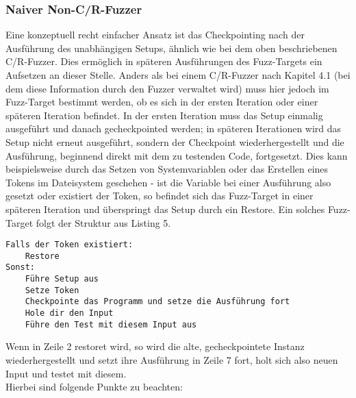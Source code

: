 \documentclass[a4paper]{article}
\begin{document}
\subsubsection{Naiver Non-C/R-Fuzzer}
Eine konzeptuell recht einfacher Ansatz ist das Checkpointing nach der Ausfüh\-rung des unabhängigen Setups, ähnlich wie bei dem oben beschriebenen C/R-Fuzzer.
Dies ermöglich in späteren Ausführungen des Fuzz-Targets ein Aufsetzen an dieser Stelle.
Anders als bei einem C/R-Fuzzer nach Kapitel 4.1 (bei dem diese Information durch den Fuzzer verwaltet wird) muss hier jedoch im Fuzz-Target bestimmt werden, ob es sich in der ersten Iteration oder einer späteren Iteration befindet. 
In der ersten Iteration muss das Setup einmalig ausgeführt und danach gecheckpointed werden; in späteren Iterationen wird das Setup nicht erneut ausgeführt, sondern der Checkpoint wiederhergestellt und die Ausführung, beginnend direkt mit dem zu testenden Code, fortgesetzt.
Dies kann beispielsweise durch das Setzen von Systemvariablen oder das Erstellen eines Tokens im Dateisystem geschehen - ist die Variable bei einer Ausführung also gesetzt oder existiert der Token, so befindet sich das Fuzz-Target in einer späteren Iteration und überspringt das Setup durch ein Restore.
Ein solches Fuzz-Target folgt der Struktur aus Listing 5.
\begin{lstlisting}[caption=Struktur C/R-Fuzz-Target für Non-C/R-Fuzzer]
Falls der Token existiert:
    Restore
Sonst:
    Führe Setup aus
    Setze Token
    Checkpointe das Programm und setze die Ausführung fort
    Hole dir den Input
    Führe den Test mit diesem Input aus
\end{lstlisting}
Wenn in Zeile 2 restoret wird, so wird die alte, gecheckpointete Instanz wiederhergestellt und setzt ihre Ausführung in Zeile 7 fort, holt sich also neuen Input und testet mit diesem.\\
Hierbei sind folgende Punkte zu beachten:
\end{document}

